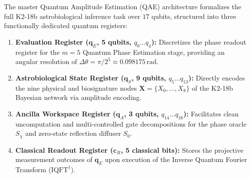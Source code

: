 The master Quantum Amplitude Estimation (QAE) architecture \cite{brassard2002} formalizes the full K2-18b astrobiological inference task over $17$ qubits, structured into three functionally dedicated quantum registers:
\begin{enumerate}[leftmargin=*]
    \item \textbf{Evaluation Register ($\mathbf{q}_E$, 5 qubits, $q_0 \dots q_4$):} Discretizes the phase readout register for the $m=5$ Quantum Phase Estimation stage, providing an angular resolution of $\Delta\theta = \pi / 2^5 \approx 0.098175\,\mathrm{rad}$.
    \item \textbf{Astrobiological State Register ($\mathbf{q}_S$, 9 qubits, $q_5 \dots q_{13}$):} Directly encodes the nine physical and biosignature nodes $\mathbf{X} = \{X_0, \dots, X_8\}$ of the K2-18b Bayesian network via amplitude encoding.
    \item \textbf{Ancilla Workspace Register ($\mathbf{q}_A$, 3 qubits, $q_{14} \dots q_{16}$):} Facilitates clean uncomputation and multi-controlled gate decompositions for the phase oracle $S_\chi$ and zero-state reflection diffuser $S_0$.
    \item \textbf{Classical Readout Register ($\mathbf{c}_R$, 5 classical bits):} Stores the projective measurement outcomes of $\mathbf{q}_E$ upon execution of the Inverse Quantum Fourier Transform ($\mathrm{IQFT}^\dagger$).
\end{enumerate}

